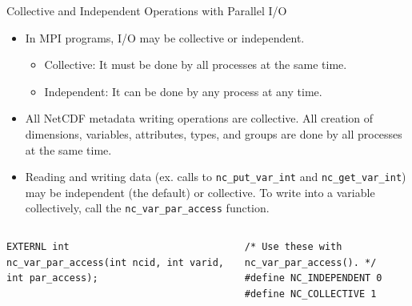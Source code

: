 \documentclass[compress,11pt,xcolor=svgnames,aspectratio=169]{beamer}
\begin{document}
\begin{frame}[fragile]{Collective and Independent Operations with Parallel I/O}

\begin{itemize}
\setlength\itemsep{0.3cm}

  \item In MPI programs, I/O may be collective or independent.

    \begin{itemize}
      \item Collective: It must be done by all processes at the same time.
      \item Independent: It can be done by any process at any time.
    \end{itemize}

  \item All NetCDF metadata writing operations are collective. All creation of dimensions, variables, attributes, types, and groups are done by all processes at the same time.

  \item Reading and writing data (ex. calls to \verb|nc_put_var_int| and \verb|nc_get_var_int|) may be independent (the default) or collective. To write into a variable collectively, call the \verb|nc_var_par_access| function.

\end{itemize}

\vspace*{-0.3cm}

\begin{columns}
\begin{column}{0.45\textwidth}
\begin{block}{}
\vspace*{-0.3cm}
{ \tiny
\begin{verbatim}
EXTERNL int
nc_var_par_access(int ncid, int varid, int par_access);
\end{verbatim}
}
\vspace*{-0.3cm}
\end{block}
\end{column}

\begin{column}{0.35\textwidth}
\begin{block}{}
\vspace*{-0.3cm}
{ \tiny
\begin{verbatim}
/* Use these with nc_var_par_access(). */
#define NC_INDEPENDENT 0
#define NC_COLLECTIVE 1
\end{verbatim}
}
\vspace*{-0.3cm}
\end{block}
\end{column}
\end{columns}

\end{frame}
\end{document}
